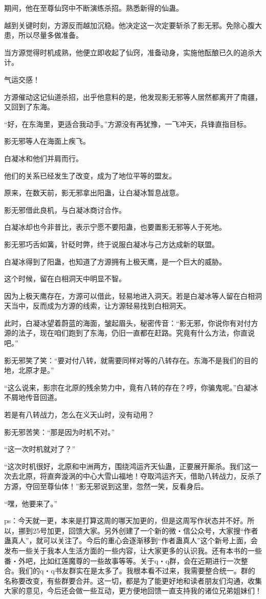 \begin{this_body}
期间，他在至尊仙窍中不断演练杀招。熟悉新得的仙蛊。

越到关键时刻，方源反而越加沉稳。他决定这一次定要斩杀了影无邪。免除心腹大患，所以尽量多做准备。

当方源觉得时机成熟，他便立即收起了仙窍，准备动身，实施他酝酿已久的追杀大计。

气运交感！

方源催动这记仙道杀招，出乎他意料的是，他发现影无邪等人居然都离开了南疆，又回到了东海。

“好，在东海里，更适合我动手。”方源没有再犹豫，一飞冲天，兵锋直指目标。

影无邪等人在海面上疾飞。

白凝冰和他们并肩而行。

他们的关系已经发生了改变，成为了地位平等的盟友。

原来，在数天前，影无邪拿出阳蛊，让白凝冰暂息战意。

影无邪借此良机，与白凝冰商讨合作。

白凝冰却也今非昔比，表示宁愿不要阳蛊，也要置影无邪等人于死地。

影无邪巧舌如簧，针砭时弊，终于说服白凝冰与己方达成新的联盟。

白凝冰得到了阳蛊，也知道了方源拥有上极天鹰，是一个巨大的威胁。

这个时候，留在白相洞天中明显不智。

因为上极天鹰存在，方源可以借此，轻易地进入洞天。若是白凝冰等人留在白相洞天当中，反而成为方源的线索，让方源轻易找到白相洞天。

此时，白凝冰望着蔚蓝的海面，皱起眉头，秘密传音：“影无邪，你说你有对付方源的法子，现在咱们跑到了东海，仍旧一直都在赶路。究竟有什么方法，你直说吧。”

影无邪笑了笑：“要对付八转，就需要同样对等的八转存在。东海不是我们的目的地，北原才是。”

“这么说来，影宗在北原的残余势力中，竟有八转的存在？哼，你骗鬼呢。”白凝冰不屑地传音回道。

若是有八转战力，怎么在义天山时，没有动用？

影无邪苦笑：“那是因为时机不对。”

“这一次时机就对了？”

“这次时机很好，北原和中洲两方，围绕鸿运齐天仙蛊，正要展开厮杀。我们这一次去北原，将直奔漩涡的中心大雪山福地！夺取鸿运齐天，借助八转战力，反杀了方源，夺回至尊仙体！”影无邪说到这里，忽然一笑，反看身后。

“嘿，他要来了。”

ps：今天就一更，本来是打算这周的哪天加更的，但是这周写作状态并不好。所以，挪到25号加更，回馈大家。另外创建了一个新的微・信公众号，大家搜“作者蛊真人”，就可以关注了。今后的重心会逐渐移到“作者蛊真人”这个新号上面，会发布一些关于我本人生活方面的一些内容，让大家更多的认识我。还有本书的一些番・外吧，比如红莲魔尊的一些故事等等。关于q・q群，会在近期进行一次整合。我们的q・q书友群实在是太多了。我根本看不过来，我需要整合统一。群的名称要改变，有些群要合并。这一切，都是为了能更好地和读者朋友们沟通，收集大家的意见，今后还会做一些互动，更方便地回馈一直支持我的诸位兄弟姐妹们！

\end{this_body}

